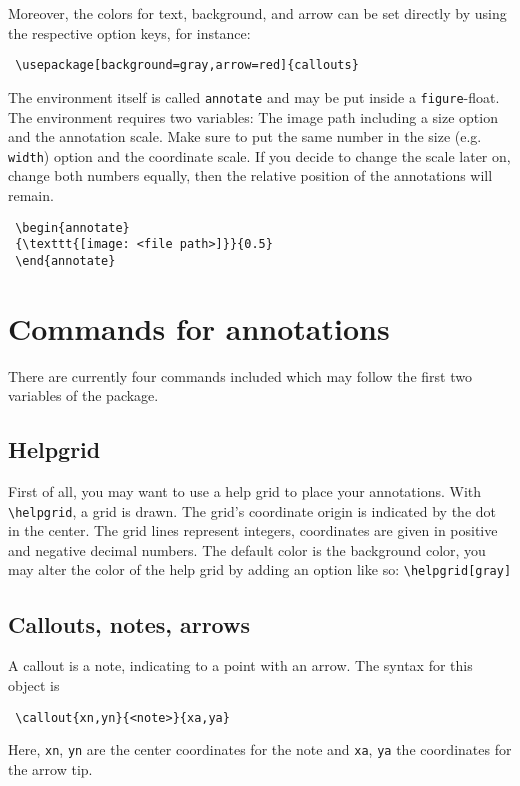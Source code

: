 \documentclass[a4paper,11pt]{article}
\begin{document}
Moreover, the colors for text, background, and arrow can be set directly by using the respective option keys, for instance:

\begin{lstlisting}
 \usepackage[background=gray,arrow=red]{callouts}
\end{lstlisting}

The environment itself is called \texttt{annotate} and may be put inside a \texttt{figure}-float. The environment requires two variables: The image path including a size option and the annotation scale. Make sure to put the same number in the size (e.g. \texttt{width}) option and the coordinate scale. If you decide to change the scale later on, change both numbers equally, then the relative position of the annotations will remain.

\begin{lstlisting}
 \begin{annotate}
 {\texttt{[image: <file path>]}}{0.5}
 \end{annotate}
\end{lstlisting}

\section{Commands for annotations}
There are currently four commands included which may follow the first two variables of the package.

\subsection{Helpgrid}
First of all, you may want to use a help grid to place your annotations. With \texttt{\textbackslash helpgrid}, a grid is drawn. The grid's coordinate origin is indicated by the dot in the center. The grid lines represent integers, coordinates are given in positive and negative decimal numbers. The default color is the background color, you may alter the color of the help grid by adding an option like so: \texttt{\textbackslash helpgrid[gray]}

\subsection{Callouts, notes, arrows }
A callout is a note, indicating to a point with an arrow. The syntax for this object is
\begin{lstlisting}
 \callout{xn,yn}{<note>}{xa,ya}
\end{lstlisting}
Here, \texttt{xn}, \texttt{yn} are the center coordinates for the note and \texttt{xa}, \texttt{ya} the coordinates for the arrow tip.
\end{document}
